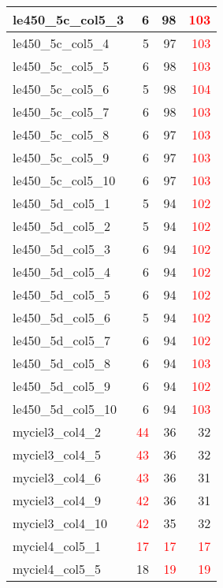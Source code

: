 \begin{longtable}{l|r|r|r}
  le450\_5c\_col5\_3 & 6 & 98 & \textcolor{red}{103} \\ \hline
  le450\_5c\_col5\_4 & 5 & 97 & \textcolor{red}{103} \\ \hline
  le450\_5c\_col5\_5 & 6 & 98 & \textcolor{red}{103} \\ \hline
  le450\_5c\_col5\_6 & 5 & 98 & \textcolor{red}{104} \\ \hline
  le450\_5c\_col5\_7 & 6 & 98 & \textcolor{red}{103} \\ \hline
  le450\_5c\_col5\_8 & 6 & 97 & \textcolor{red}{103} \\ \hline
  le450\_5c\_col5\_9 & 6 & 97 & \textcolor{red}{103} \\ \hline
  le450\_5c\_col5\_10 & 6 & 97 & \textcolor{red}{103} \\ \hline
  le450\_5d\_col5\_1 & 5 & 94 & \textcolor{red}{102} \\ \hline
  le450\_5d\_col5\_2 & 5 & 94 & \textcolor{red}{102} \\ \hline
  le450\_5d\_col5\_3 & 6 & 94 & \textcolor{red}{102} \\ \hline
  le450\_5d\_col5\_4 & 6 & 94 & \textcolor{red}{102} \\ \hline
  le450\_5d\_col5\_5 & 6 & 94 & \textcolor{red}{102} \\ \hline
  le450\_5d\_col5\_6 & 5 & 94 & \textcolor{red}{102} \\ \hline
  le450\_5d\_col5\_7 & 6 & 94 & \textcolor{red}{102} \\ \hline
  le450\_5d\_col5\_8 & 6 & 94 & \textcolor{red}{103} \\ \hline
  le450\_5d\_col5\_9 & 6 & 94 & \textcolor{red}{102} \\ \hline
  le450\_5d\_col5\_10 & 6 & 94 & \textcolor{red}{103} \\ \hline
  myciel3\_col4\_2 & \textcolor{red}{44} & 36 & 32 \\ \hline
  myciel3\_col4\_5 & \textcolor{red}{43} & 36 & 32 \\ \hline
  myciel3\_col4\_6 & \textcolor{red}{43} & 36 & 31 \\ \hline
  myciel3\_col4\_9 & \textcolor{red}{42} & 36 & 31 \\ \hline
  myciel3\_col4\_10 & \textcolor{red}{42} & 35 & 32 \\ \hline
  myciel4\_col5\_1 & \textcolor{red}{17} & \textcolor{red}{17} & \textcolor{red}{17} \\ \hline
  myciel4\_col5\_5 & 18 & \textcolor{red}{19} & \textcolor{red}{19} \\ \hline

\end{longtable}
